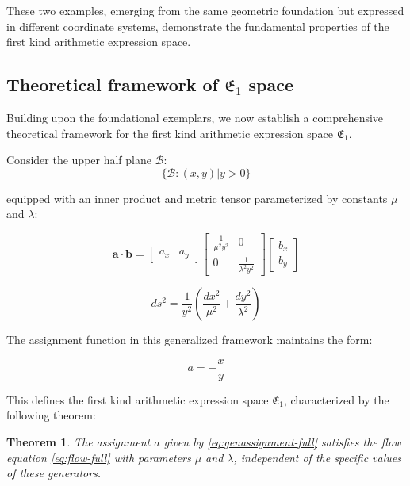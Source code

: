 \documentclass[12pt]{article}
\newtheorem{theorem}{Theorem}[section]
\begin{document}
These two examples, emerging from the same geometric foundation but expressed in different coordinate systems, demonstrate the fundamental properties of the first kind arithmetic expression space.

\subsection{Theoretical framework of $\mathfrak{E}_1$ space}\label{subsec:generalframework-full}

Building upon the foundational exemplars, we now establish a comprehensive theoretical framework for the first kind arithmetic expression space $\mathfrak{E}_1$. 

Consider the upper half plane $\mathcal{B}$:
$$
\{\mathcal{B}: (x, y) | y > 0 \}
$$

equipped with an inner product and metric tensor parameterized by constants $\mu$ and $\lambda$:

$$
\mathbf{a} \cdot \mathbf{b} = \begin{bmatrix} a_x & a_y \end{bmatrix} \begin{bmatrix} \frac{1}{\mu^2 y^2} & 0 \\ 0 & \frac{1}{\lambda^2 y^2} \end{bmatrix} \begin{bmatrix} b_x \\ b_y \end{bmatrix}
$$

$$
ds^2 = \frac{1}{y^2}\left(\frac{dx^2}{\mu^2} + \frac{dy^2}{\lambda^2}\right)
$$

The assignment function in this generalized framework maintains the form:

\begin{equation}\label{eq:genassignment-full}
a = - \frac{x}{y}
\end{equation}

This defines the first kind arithmetic expression space $\mathfrak{E}_1$, characterized by the following theorem:

\begin{theorem}\label{thm:generalE1-full}
The assignment $a$ given by \eqref{eq:genassignment-full} satisfies the flow equation \eqref{eq:flow-full} with parameters $\mu$ and $\lambda$, independent of the specific values of these generators.
\end{theorem}
\end{document}
